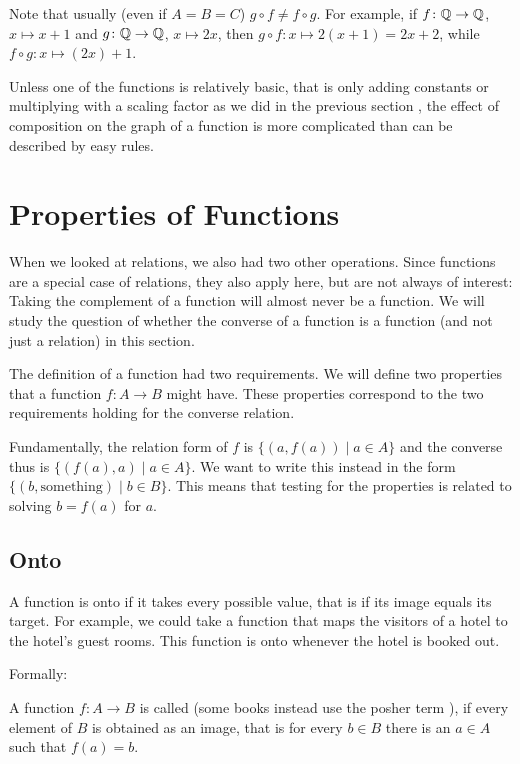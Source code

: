 Note that usually (even if $A=B=C$) $g\circ f\not=f\circ g$. For example, if
$f\colon{\mathbb Q}\to{\mathbb Q}$, $x\mapsto x+1$ and 
$g\colon{\mathbb Q}\to{\mathbb Q}$, $x\mapsto 2x$, then $g\circ f\colon x\mapsto 2(x+1)=2x+2$, while
$f\circ g\colon x\mapsto (2x)+1$.
\smallskip

Unless one of the functions is relatively basic, that is only adding
constants or multiplying with a scaling factor as we did in the previous
section , the effect of
composition on the graph of a function is more complicated than can be
described by easy rules.

\section{Properties of Functions}

When we looked at relations, we also had two other operations. Since functions are a
special case of relations, they also apply here, but are not always of interest: 
Taking the complement of a function will almost never be a function. We will study the
question of whether the converse of a function is a function (and not just a relation)
in this section.
\medskip

The definition of a function had two requirements. We will define two properties that a
function $f\colon A\to B$ might have. These properties correspond to the two requirements holding for the converse relation.

Fundamentally, the relation form of $f$ is $\{(a,f(a))\mid a\in A\}$ and the converse
thus is $\{(f(a),a)\mid a\in A\}$. We want to write this instead in
the form $\{(b,\mbox{something})\mid b\in B\}$. This means that testing for the properties
is related to solving $b=f(a)$ for $a$.

\subsection{Onto}

A function is onto if it takes every possible value, that is if its image
equals its target.
For example, we could take a function that maps the visitors of a hotel to
the hotel's guest rooms. This function is onto whenever the hotel is booked
out.

Formally:
\begin{defn}
A function $f\colon A\to B$ is called  (some books instead use the posher
term ), if every element of $B$ is obtained as an image, that is for every $b\in B$ there is an $a\in A$ such that $f(a)=b$.
\end{defn}

